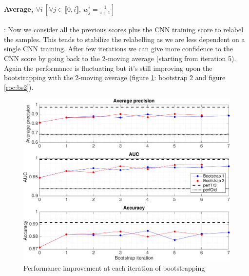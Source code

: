 \documentclass[a4paper]{article}
\begin{document}
        \paragraph{Average, $\forall i\:[\forall j\in\llbracket 0,i\rrbracket,\:w_j^i=\frac{1}{i+1}]$}: Now we consider all the previous scores plus the CNN training score to relabel the samples. This tends to stabilize the relabelling as we are less dependent on a single CNN training. After few iterations we can give more confidence to the CNN score by going back to the 2-moving average (starting from iteration 5).
        Again the performance is fluctuating but it's still improving upon the bootstrapping with the 2-moving average (figure \ref{perfBoot}: bootstrap 2 and figure \ref{roc:bs2}). 
            \begin{figure}[H]
                \centering
                \includegraphics[width=13cm]{exp4/ap_auc_2}
                \caption{Performance improvement at each iteration of bootstrapping\label{perfBoot}}
            \end{figure}
\end{document}
